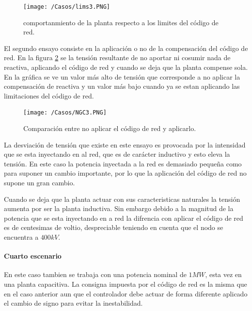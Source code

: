 \documentclass{book}
\begin{document}
\begin{figure}[h!]
\centering
\texttt{[image: /Casos/lims3.PNG]}
\caption{comportanmiento de la planta respecto a los limites del c\'odigo de red. }
\label{lims3}
\end{figure} \par

El segundo ensayo consiste en la aplicaci\'on o no de la compensaci\'on del c\'odigo de red. En la figura \ref{NGC3} se la tensi\'on resultante de no aportar ni cosumir nada de reactiva, aplicando el c\'odigo de red y cuando se deja que la planta compense sola. En la gr\'afica se ve un valor m\'as alto de tensi\'on que corresponde a no aplicar la compensaci\'on de reactiva y un valor m\'as bajo cuando ya se estan aplicando las limitaciones del c\'odigo de red. \par

\begin{figure}[h!]
\centering
\texttt{[image: /Casos/NGC3.PNG]}
\caption{Comparaci\'on entre no aplicar el c\'odigo de red y aplicarlo. }
\label{NGC3}
\end{figure} \par

La desviaci\'on de tensi\'on que existe en este ensayo es provocada por la intensidad que se esta inyectando en al red, que es de car\'acter inductivo y esto eleva la tensi\'on. En este caso la potencia inyectada a la red es demasiado pequeña como para suponer un cambio importante, por lo que la aplicaci\'on del c\'odigo de red no supone un gran cambio.  \par

Cuando se deja que la planta actuar con sus caracteristicas naturales la tensi\'on aumenta por ser la planta inductiva. Sin embargo debido a la magnitud de la potencia que se esta inyectando en a red la difrencia con aplicar el c\'odigo de red es de centesimas de voltio, despreciable teniendo en cuenta que el nodo se encuentra a $400kV$. \par



	\paragraph{Cuarto escenario}

En este caso tambien se trabaja con una potencia nominal de $1MW$, esta vez en una planta capacitiva. La consigna impuesta por el c\'odigo de red es la misma que en el caso anterior aun que el controlador debe actuar de forma diferente aplicado el cambio de signo para evitar la inestabilidad. 
\end{document}
